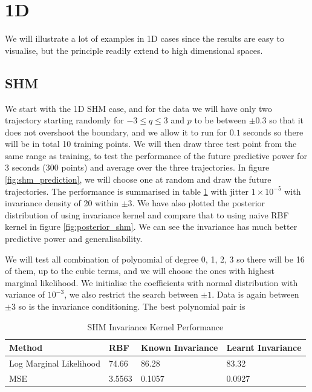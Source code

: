 \documentclass{statsmsc}
\begin{document}
\section{1D}
We will illustrate a lot of examples in 1D cases since the results are easy to visualise, but the principle readily extend to high dimensional spaces. 

\subsection{SHM}
We start with the 1D SHM case, and for the data we will have only two trajectory starting randomly for $-3\le q\le3$ and $p$ to be between $\pm 0.3$ so that it does not overshoot the boundary, and we allow it to run for $0.1$ seconds so there will be in total 10 training points. 
We will then draw three test point from the same range as training, to test the performance of the future predictive power for 3 seconds (300 points) and average over the three trajectories. 
In figure \ref{fig:shm_prediction}, we will choose one at random and draw the future trajectories.
The performance is summarised in table \ref{tab:shm_performance} with jitter $1\times 10^{-5}$ with invariance density of 20 within $\pm 3$. 
We have also plotted the posterior distribution of using invariance kernel and compare that to using naive RBF kernel in figure \ref{fig:posterior_shm}.
We can see the invariance has much better predictive power and generalisability.

We will test all combination of polynomial of degree 0, 1, 2, 3 so there will be 16 of them, up to the cubic terms, and we will choose the ones with highest marginal likelihood.
We initialise the coefficients with normal distribution with variance of $10^{-3}$, we also restrict the search between $\pm 1$.
Data is again between $\pm 3$ so is the invariance conditioning.
The best polynomial pair is 

\begin{table}[H]
  \centering
  \begin{tabular}{l l l l }
\hline
Method           & RBF & Known Invariance&  Learnt Invariance\\
  \hline
Log Marginal Likelihood & 74.66 & 86.28 & 83.32  \\
MSE & 3.5563 & 0.1057 & 0.0927 \\
                    \hline
  \end{tabular}
  \caption{SHM Invariance Kernel Performance}
  \label{tab:shm_performance}
\end{table}
\end{document}
